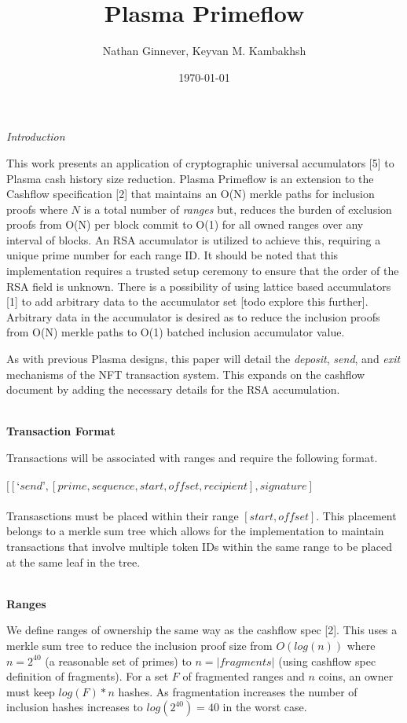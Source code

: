 \documentclass[12pt]{article}
\title{Plasma Primeflow}
\author{Nathan Ginnever, Keyvan M. Kambakhsh}
\date{\today}
\begin{document}
\maketitle
\centerline{\textit{Introduction}}

This work presents an application of cryptographic universal accumulators [5] to Plasma cash history size reduction. Plasma Primeflow is an extension to the Cashflow specification [2] that maintains an O(N) merkle paths for inclusion proofs where $N$ is a total number of \textit{ranges} but, reduces the burden of exclusion proofs from O(N) per block commit to O(1) for all owned ranges over any interval of blocks. An RSA accumulator is utilized to achieve this, requiring a unique prime number for each range ID. It should be noted that this implementation requires a trusted setup ceremony to ensure that the order of the RSA field is unknown. There is a possibility of using lattice based accumulators [1] to add arbitrary data to the accumulator set [todo explore this further]. Arbitrary data in the accumulator is desired as to reduce the inclusion proofs from O(N) merkle paths to O(1) batched inclusion accumulator value. 

As with previous Plasma designs, this paper will detail the \textit{deposit}, \textit{send}, and \textit{exit} mechanisms of the NFT transaction system. This expands on the cashflow document by adding the necessary details for the RSA accumulation.
\\
\\
\centerline{\textbf{Transaction Format}}

Transactions will be associated with ranges and require the following format.
\\
\\
$[[‘send’, [prime, sequence, start, offset, recipient], signature]$
\\
\\
Transasctions must be placed within their range $[start, offset]$. This placement belongs to a merkle sum tree which allows for the implementation to maintain transactions that involve multiple token IDs within the same range to be placed at the same leaf in the tree.
\\
\\
\centerline{\textbf{Ranges}}

We define ranges of ownership the same way as the cashflow spec [2]. This uses a merkle sum tree to reduce the inclusion proof size from $O(log(n))$ where $n = 2^{40}$ (a reasonable set of primes) to $n = |fragments|$ (using cashflow spec definition of fragments). For a set $F$ of fragmented ranges and $n$ coins, an owner must keep $log(F) * n$ hashes. As fragmentation increases the number of inclusion hashes increases to $log(2^{40}) = 40$ in the worst case. 
\end{document}
